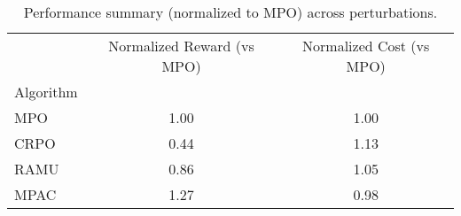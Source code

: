 \begin{table}
\caption{Performance summary (normalized to MPO) across perturbations.}
\label{tab:perf_norm_mpo}
\begin{tabular}{lcc}
\toprule
 & Normalized Reward (vs MPO) & Normalized Cost (vs MPO) \\
Algorithm &  &  \\
\midrule
MPO & 1.00 & 1.00 \\
CRPO & 0.44 & 1.13 \\
RAMU & 0.86 & 1.05 \\
MPAC & 1.27 & 0.98 \\
\bottomrule
\end{tabular}
\end{table}
